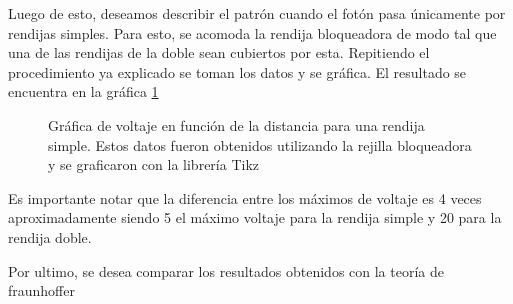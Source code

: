 \documentclass[12pt]{exam}
\begin{document}
Luego de esto, deseamos describir el patrón cuando el fotón pasa únicamente por rendijas simples. Para esto, se acomoda la rendija bloqueadora de modo tal que una de las rendijas de la doble sean cubiertos por esta. Repitiendo el procedimiento ya explicado se toman los datos y se gráfica. El resultado se encuentra en la gráfica \ref{fig:Laser}
\begin{figure}[h]
    \centering
    \caption{Gráfica de voltaje en función de la distancia para
una rendija simple. Estos datos fueron obtenidos utilizando
la rejilla bloqueadora y se graficaron con la librería Tikz}
    \label{fig:Laser}
\end{figure}

Es importante notar que la diferencia entre los máximos de voltaje es 4 veces aproximadamente siendo 5 el máximo voltaje para la rendija simple y 20 para la rendija doble. 

Por ultimo, se desea comparar los resultados obtenidos con la teoría de fraunhoffer
\end{document}
